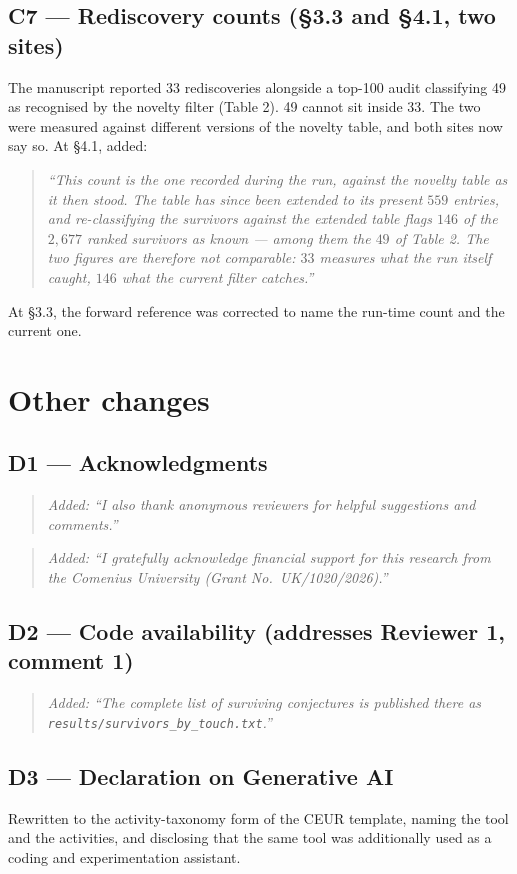 \documentclass[11pt,a4paper]{article}
\newenvironment{chg}{%
  \begin{quote}\small\color{black!80}\itshape}{\end{quote}}
\begin{document}
\subsection{C7 --- Rediscovery counts (\S3.3 and \S4.1, two sites)}
The manuscript reported 33 rediscoveries alongside a top-100 audit classifying 49
as recognised by the novelty filter (Table 2). 49 cannot sit inside 33. The two
were measured against different versions of the novelty table, and both sites now
say so. At \S4.1, added:
\begin{chg}
``This count is the one recorded \emph{during the run}, against the novelty table
as it then stood. The table has since been extended to its present $559$ entries,
and re-classifying the survivors against the extended table flags $146$ of the
$2{,}677$ ranked survivors as known --- among them the $49$ of Table 2. The two
figures are therefore not comparable: $33$ measures what the run itself caught,
$146$ what the current filter catches.''
\end{chg}
At \S3.3, the forward reference was corrected to name the run-time count and the
current one.

\section{Other changes}

\subsection{D1 --- Acknowledgments}
\begin{chg}
Added: ``I also thank anonymous reviewers for helpful suggestions and comments.''
\end{chg}
\begin{chg}
Added: ``I gratefully acknowledge financial support for this research from the
Comenius University (Grant No.\ UK/1020/2026).''
\end{chg}

\subsection{D2 --- Code availability (addresses Reviewer 1, comment 1)}
\begin{chg}
Added: ``The complete list of surviving conjectures is published there as
\texttt{results/survivors\_by\_touch.txt}.''
\end{chg}

\subsection{D3 --- Declaration on Generative AI}
Rewritten to the activity-taxonomy form of the CEUR template, naming the tool and
the activities, and disclosing that the same tool was additionally used as a
coding and experimentation assistant.
\end{document}
